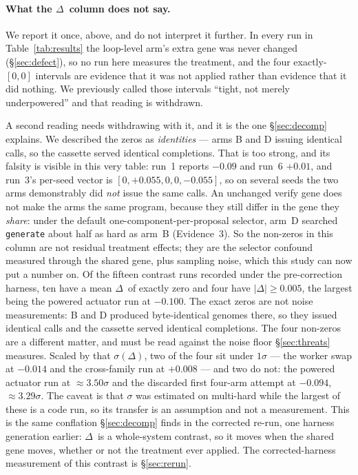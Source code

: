 \documentclass[11pt]{article}
\newcommand{\dd}{\ensuremath{\Delta}}
\begin{document}
\paragraph{What the \dd\ column does not say.} We report it once, above, and do not
interpret it further. In every run in Table~\ref{tab:results} the loop-level arm's extra gene
was never changed (\S\ref{sec:defect}), so no run here measures the treatment, and the four
exactly-$[0,0]$ intervals are evidence that it was not applied rather than evidence that it
did nothing. We previously called those intervals ``tight, not merely underpowered'' and that
reading is withdrawn.

A second reading needs withdrawing with it, and it is the one \S\ref{sec:decomp} explains. We
described the zeros as \emph{identities} --- arms B and D issuing identical calls, so the
cassette served identical completions. That is too strong, and its falsity is visible in this
very table: run~1 reports $-0.09$ and run~6 $+0.01$, and run~3's per-seed vector is
$[0,+0.055,0,0,-0.055]$, so on several seeds the two arms demonstrably did \emph{not} issue the
same calls. An unchanged verify gene does not make the arms the same program, because they
still differ in the gene they \emph{share}: under the default one-component-per-proposal
selector, arm~D searched \texttt{generate} about half as hard as arm~B (Evidence~3). So the
non-zeros in this column are not residual treatment effects; they are the selector confound
measured through the shared gene, plus sampling noise, which this study can now put a number on.
Of the
fifteen contrast runs recorded under the pre-correction harness, ten have a mean \dd\ of
exactly zero and four have $|\dd| \ge 0.005$, the largest being the powered actuator run at
$-0.100$. The exact zeros are not noise measurements: B and D produced byte-identical genomes
there, so they issued identical calls and the cassette served identical completions. The four
non-zeros are a different matter, and must be read against the noise floor
\S\ref{sec:threats} measures. Scaled by that $\sigma(\dd)$, two of the
four sit under $1\sigma$ --- the worker swap at $-0.014$ and the cross-family run at $+0.008$ ---
and two do not: the powered actuator run at $\approx\!3.50\sigma$ and the discarded first four-arm
attempt at $-0.094$, $\approx\!3.29\sigma$. The caveat is that $\sigma$ was estimated on
multi-hard while the largest of these is a code run, so its transfer is an assumption and not a
measurement. This is the same conflation \S\ref{sec:decomp} finds in the corrected re-run, one
harness generation earlier: \dd\ is a whole-system contrast, so it moves when the shared gene
moves, whether or not the treatment ever applied. The corrected-harness measurement of this
contrast is \S\ref{sec:rerun}.
\end{document}

